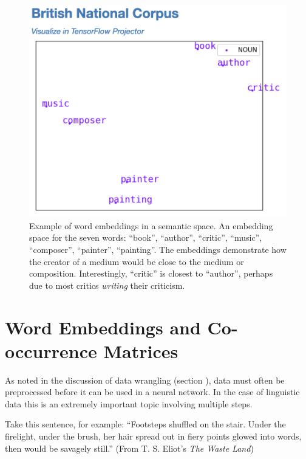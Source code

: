 \begin{figure}[h]
    \centering
    \includegraphics[scale=.5]{./images/Word_vector_demo.jpg}
    \caption[Generated using \url{http://vectors.nlpl.eu/explore/embeddings/en/}.]{Example of word embeddings in a semantic space. An embedding space for the seven words: ``book'', ``author'', ``critic'', ``music'', ``composer'', ``painter'', ``painting''. The embeddings demonstrate how the creator of a medium would be close to the medium or composition. Interestingly, ``critic'' is closest to ``author'', perhaps due to most critics \textit{writing} their criticism.}
 \label{f:writerPainterExample}
\end{figure}


\section{Word Embeddings and Co-occurrence Matrices}

As noted in the discussion of data wrangling (section ), data must often be preprocessed before it can be used in a neural network. In the case of linguistic data this is an extremely important topic involving multiple steps.  

Take this sentence, for example: ``Footsteps shuffled on the stair. Under the firelight, under the brush, her hair spread out in fiery points glowed into words, then would be savagely still.'' (From T. S. Eliot's \textit{The Waste Land})

